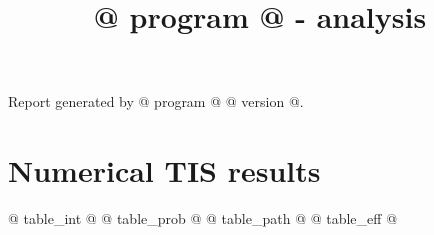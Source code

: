 \documentclass[a4paper]{article}
\title{@{{ program }}@ - analysis}
\author{}
\date{}
\begin{document}
\maketitle
\noindent Report generated by @{{ program }}@ @{{ version }}@.

\section{Numerical TIS results}

@{{ table_int }}@
@{{ table_prob }}@
@{{ table_path }}@
@{{ table_eff }}@
\end{document}

